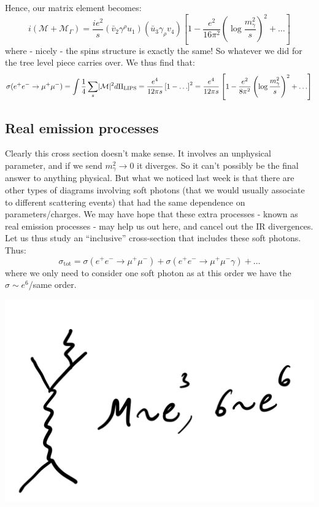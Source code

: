 Hence, our matrix element becomes:
\begin{equation}
    i(\mathcal{M} + \mathcal{M}_\Gamma) = \frac{ie^2}{s}(\bar{v}_2\gamma^\rho u_1)(\bar{u}_3\gamma_\rho v_4)\left[1 - \frac{e^2}{16\pi^2}\left(\log\frac{m_\gamma^2}{s}\right)^2 + \ldots\right]
\end{equation}
where - nicely - the spins structure is exactly the same! So whatever we did for the tree level piece carries over. We thus find that:
\begin{equation}
    \sigma(e^+e^- \to \mu^+\mu^-) = \int \frac{1}{4}\sum_s \lvert \mathcal{M} \rvert^2 d\Pi_{\text{LIPS}} = \frac{e^4}{12\pi s}\left[1 - \ldots\right]^2 = \frac{e^4}{12\pi s}\left[1 - \frac{e^2}{8\pi^2}\left(\log\frac{m_\gamma^2}{s}\right)^2 + \ldots\right]
\end{equation}

\subsection{Real emission processes}
Clearly this cross section doesn't make sense. It involves an unphysical parameter, and if we send $m_\gamma^2 \to 0$ it diverges. So it can't possibly be the final answer to anything physical. But what we noticed last week is that there are other types of diagrams involving soft photons (that we would usually associate to different scattering events) that had the same dependence on parameters/charges. We may have hope that these extra processes - known as real emission processes - may help us out here, and cancel out the IR divergences. Let us thus study an ``inclusive'' cross-section that includes these soft photons. Thus:
\begin{equation}
    \sigma_{\text{tot}} = \sigma(e^+e^- \to \mu^+\mu^-) + \sigma(e^+e^- \to \mu^+\mu^-\gamma) + \ldots
\end{equation}
where we only need to consider one soft photon as at this order we have the $\sigma \sim e^6$/same order.

\begin{center}
    \includegraphics[scale=0.35]{Lectures/Images/lec15-eorder.png}
\end{center}

